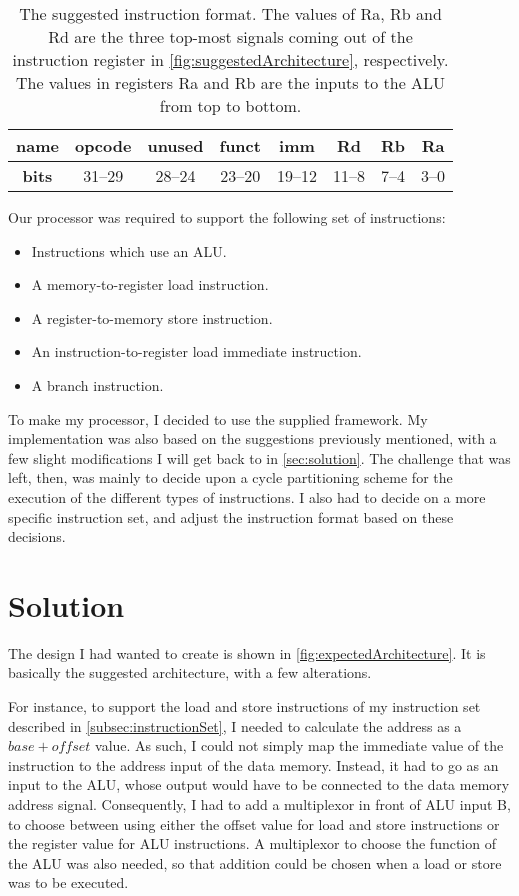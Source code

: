 \documentclass[11pt]{article}
\begin{document}
\begin{table}[htbp]
  \centering
  \begin{tabular}{|c|c|c|c|c|c|c|c|}
    \hline
    {\bf name} & opcode & unused & funct & imm & Rd & Rb & Ra \\ \hline
    {\bf bits} & 31--29 & 28--24 & 23--20 & 19--12 & 11--8 & 7--4 & 3--0 \\ \hline
  \end{tabular}
  \caption{The suggested instruction format. The values of Ra, Rb and Rd are the three top-most signals coming out of the instruction register in \autoref{fig:suggestedArchitecture}, respectively. The values in registers Ra and Rb are the inputs to the ALU from top to bottom.}
  \label{tab:suggestedFormat}
\end{table}


Our processor was required to support the following set of instructions:
\begin{itemize}
\item Instructions which use an ALU.
\item A memory-to-register load instruction.
\item A register-to-memory store instruction.
\item An instruction-to-register load immediate instruction.
\item A branch instruction.
\end{itemize}

To make my processor, I decided to use the supplied framework. My
implementation was also based on the suggestions previously mentioned,
with a few slight modifications I will get back to in
\autoref{sec:solution}. The challenge that was left, then, was mainly
to decide upon a cycle partitioning scheme for the execution of the
different types of instructions. I also had to decide on a more
specific instruction set, and adjust the instruction format based on
these decisions.

\section{Solution}
\label{sec:solution}
The design I had wanted to create is shown in
\autoref{fig:expectedArchitecture}. It is basically the suggested
architecture, with a few alterations. 

For instance, to support the load and store instructions of my
instruction set described in \autoref{subsec:instructionSet}, I needed
to calculate the address as a $base + offset$ value. As such, I could
not simply map the immediate value of the instruction to the address
input of the data memory. Instead, it had to go as an input to the
ALU, whose output would have to be connected to the data memory
address signal. Consequently, I had to add a multiplexor in front of
ALU input B, to choose between using either the offset value for load
and store instructions or the register value for ALU instructions. A
multiplexor to choose the function of the ALU was also needed, so that
addition could be chosen when a load or store was to be executed.
\end{document}
